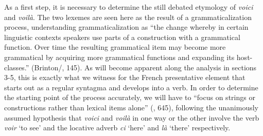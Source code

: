 \documentclass[output=paper]{langscibook}
\begin{document}
\begin{itemize}
\begin{itemize}
\begin{itemize}
\begin{itemize}
\begin{itemize}
\begin{itemize}
\begin{itemize}
As a first step, it is necessary to determine the still debated etymology of \textit{voici} and \textit{voilà}. The two lexemes are seen here as the result of a grammaticalization process, understanding grammaticalization as “the change whereby in certain linguistic contexts speakers use parts of a construction with a grammatical function. Over time the resulting grammatical item may become more grammatical by acquiring more grammatical functions and expanding its host-classes.” (Brinton/\citealt{Traugott2005}, 145). As will become apparent along the analysis in sections 3-5, this is exactly what we witness for the French presentative element that starts out as a regular syntagma and develops into a verb. In order to determine the starting point of the process accurately, we will have to “focus on strings or constructions rather than lexical items alone” (\citealt{Traugott2003}, 645), following the unanimously assumed hypothesis that \textit{voici} and \textit{voilà} in one way or the other involve the verb \textit{voir} ‘to see’ and the locative adverb \textit{ci} ‘here’ and \textit{là} ‘there’ respectively. 


\end{itemize}
\end{itemize}
\end{itemize}
\end{itemize}
\end{itemize}
\end{itemize}
\end{itemize}
\end{document}
